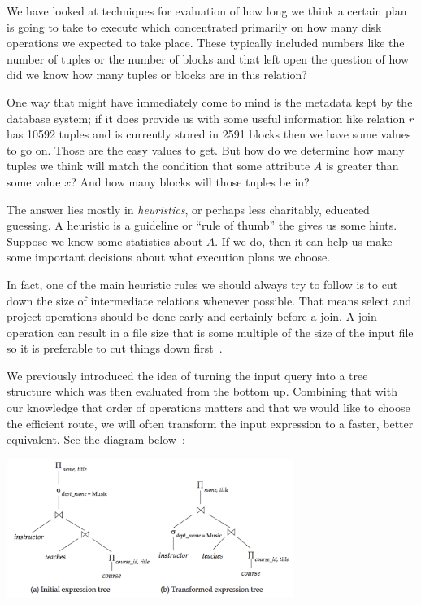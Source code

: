 We have looked at techniques for evaluation of how long we think a certain plan is going to take to execute which concentrated primarily on how many disk operations we expected to take place. These typically included numbers like the number of tuples or the number of blocks and that left open the question of how did we know how many tuples or blocks are in this relation?

One way that might have immediately come to mind is the metadata kept by the database system; if it does provide us with some useful information like relation $r$ has 10592 tuples and is currently stored in 2591 blocks then we have some values to go on. Those are the easy values to get. But how do we determine how many tuples we think will match the condition that some attribute $A$ is greater than some value $x$? And how many blocks will those tuples be in?

The answer lies mostly in \textit{heuristics}, or perhaps less charitably, educated guessing. A heuristic is a guideline or ``rule of thumb'' the gives us some hints. Suppose we know some statistics about $A$. If we do, then it can help us make some important decisions about what execution plans we choose. 

In fact, one of the main heuristic rules we should always try to follow is to cut down the size of intermediate relations whenever possible. That means select and project operations should be done early and certainly before a join. A join operation can result in a file size that is some multiple of the size of the input file so it is preferable to cut things down first~\cite{fds}.

We previously introduced the idea of turning the input query into a tree structure which was then evaluated from the bottom up. Combining that with our knowledge that order of operations matters and that we would like to choose the efficient route, we will often transform the input expression to a faster, better equivalent. See the diagram below~\cite{dsc}:

\begin{center}
\includegraphics[width=0.7\textwidth]{images/optimization-1}
\end{center}

